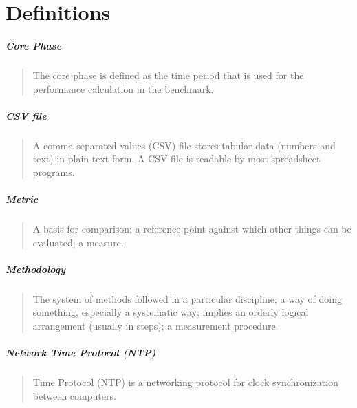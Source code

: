 \chapter{Definitions}
\label{sec:definitions}

\setlength{\parskip}{1pt}
\paragraph*{Core Phase}
\begin{quote}
The core phase is defined as the time period that is used for the performance calculation in the benchmark.
\end{quote}

\paragraph*{CSV file}
\begin{quote}
A comma-separated values (CSV) file stores tabular data (numbers and text) in plain-text form.
A CSV file is readable by most spreadsheet programs.
\end{quote}

\paragraph*{Metric}
\begin{quote}
A basis for comparison; a reference point against which other things can be evaluated; a measure.
\end{quote}

\paragraph*{Methodology}
\begin{quote}
The system of methods followed in a particular discipline; a way of doing something, especially a systematic way; implies an orderly logical arrangement (usually in steps); a measurement procedure.
\end{quote}


\paragraph*{Network Time Protocol (NTP)}
\begin{quote}
Time Protocol (NTP) is a networking protocol for clock synchronization between computers.
\end{quote}

